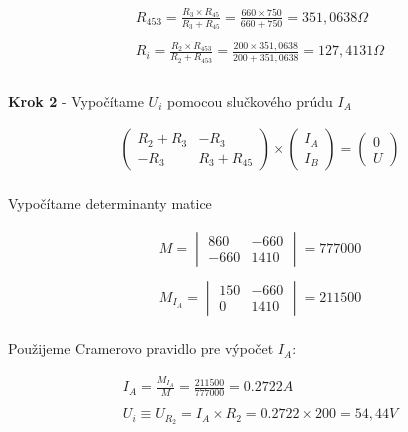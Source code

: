 \begin{gather*}
    R_{453} = \frac {R_{3} \times R_{45}} {R_{3} + R_{45}} =  \frac {660 \times 750} {660 + 750} = 351,0638 \Omega \\\\
   R_{i} = \frac {R_{2} \times R_{453}} {R_{2} + R_{453}} = \frac {200 \times 351,0638} {200 + 351,0638} = 127,4131 \Omega \\\\
\end{gather*}

\begin{center}
    \textbf{Krok 2} - Vypočítame $U_i$ pomocou slučkového prúdu $I_A$
\end{center}

\begin{gather*}
    \begin{pmatrix}
    R_2 + R_3 & -R_3 \\
    -R_3 & R_3 + R_{45}
    \end{pmatrix}
    \times
    \begin{pmatrix}
    I_A \\
    I_B
    \end{pmatrix}
    =
    \begin{pmatrix}
    0 \\
    U
    \end{pmatrix}
\end{gather*}
\\

Vypočítame determinanty matice

\begin{gather*}
    M =
    \begin{vmatrix}
    860 & -660 \\
    -660 & 1410
    \end{vmatrix}
    =
    777000
    \\\\
    M_{I_A} =
    \begin{vmatrix}
    150 & -660 \\
    0 & 1410
    \end{vmatrix}
    =
    211500
\end{gather*}
\\

Použijeme Cramerovo pravidlo pre výpočet $I_A$:

\begin{gather*}
    I_A = \frac{M_{I_A}}{M} = \frac{211500}{777000} = 0.2722 A
    \\\\
    U_i \equiv U_{R_2} = I_A \times R_2 = 0.2722 \times 200 = 54,44 V
\end{gather*}

